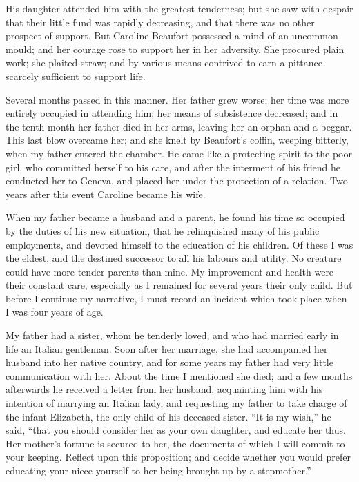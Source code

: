 His daughter attended him with the
greatest tenderness; but she saw with
despair that their little fund was rapidly
decreasing, and that there was no other
prospect of support. But Caroline
Beaufort possessed a mind of an
uncommon mould; and her courage rose
to support her in her adversity. She
procured plain work; she plaited straw;
and by various means contrived to earn
a pittance scarcely sufficient to support
life.

Several months passed in this manner.
Her father grew worse; her time
was more entirely occupied in attending
him; her means of subsistence decreased;
and in the tenth month her
father died in her arms, leaving her an
orphan and a beggar. This last blow
overcame her; and she knelt by Beaufort's
coffin, weeping bitterly, when my
father entered the chamber. He came
like a protecting spirit to the poor girl,
who committed herself to his care, and
after the interment of his friend he
conducted her to Geneva, and placed
her under the protection of a relation.
Two years after this event Caroline
became his wife.

When my father became a husband
and a parent, he found his time so occupied
by the duties of his new situation,
that he relinquished many of his public
employments, and devoted himself to
the education of his children. Of these
I was the eldest, and the destined successor
to all his labours and utility.
No creature could have more tender
parents than mine. My improvement
and health were their constant care,
especially as I remained for several years
their only child. But before I continue
my narrative, I must record an incident
which took place when I was four years
of age.

My father had a sister, whom he
tenderly loved, and who had married
early in life an Italian gentleman. Soon
after her marriage, she had accompanied
her husband into her native
country, and for some years my father
had very little communication with her.
About the time I mentioned she died;
and a few months afterwards he received
a letter from her husband, acquainting
him with his intention of
marrying an Italian lady, and requesting
my father to take charge of the infant
Elizabeth, the only child of his
deceased sister. ``It is my wish,'' he
said, ``that you should consider her as
your own daughter, and educate her
thus. Her mother's fortune is secured
to her, the documents of which I will
commit to your keeping. Reflect upon
this proposition; and decide whether
you would prefer educating your niece
yourself to her being brought up by a
stepmother.''

